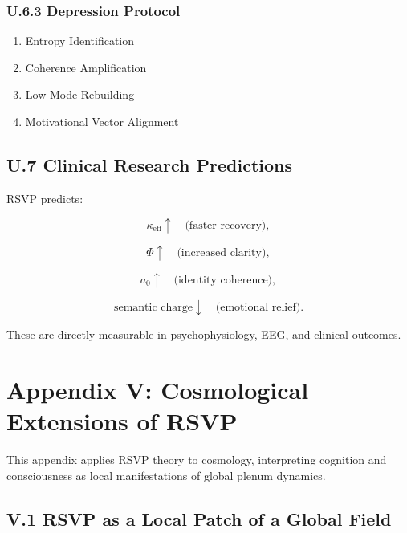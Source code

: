 \documentclass[12pt]{article}
\begin{document}
\subsubsection*{U.6.3 Depression Protocol}

\begin{enumerate}
\item Entropy Identification
\item Coherence Amplification
\item Low-Mode Rebuilding
\item Motivational Vector Alignment
\end{enumerate}


\subsection*{U.7 Clinical Research Predictions}

RSVP predicts:

\[
\kappa_{\mathrm{eff}} \uparrow
\quad\text{(faster recovery)},
\]

\[
\Phi \uparrow
\quad\text{(increased clarity)},
\]

\[
a_0 \uparrow
\quad\text{(identity coherence)},
\]

\[
\text{semantic charge} \downarrow
\quad\text{(emotional relief)}.
\]

These are directly measurable in psychophysiology, EEG, and clinical outcomes.


\section*{Appendix V: Cosmological Extensions of RSVP}

This appendix applies RSVP theory to cosmology, interpreting cognition and 
consciousness as local manifestations of global plenum dynamics.

\subsection*{V.1 RSVP as a Local Patch of a Global Field}
\end{document}
